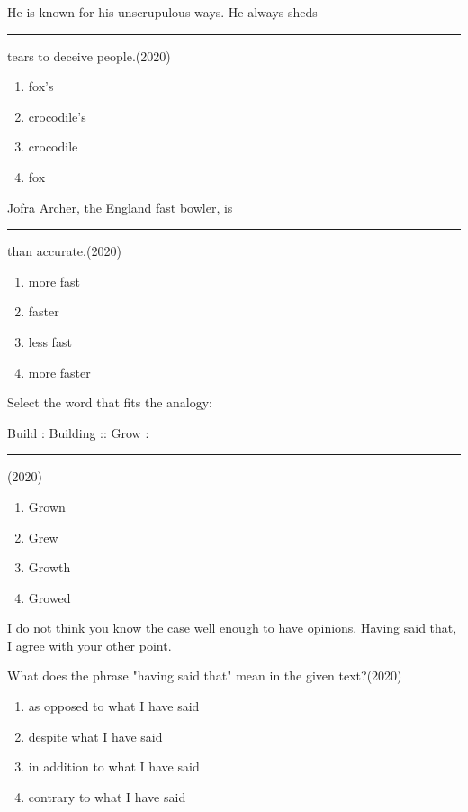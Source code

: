 \iffalse
\chapter{2020}
\author{AI24BTECH11022}
\section{me}
\fi

\usetikzlibrary{patterns}
\item He is known for his unscrupulous ways. He always sheds \rule{1cm}{0.15mm} tears to deceive people.\hfill(2020)
\begin{multicols}{2}
\begin{enumerate}
\item fox's
\item crocodile's
\item crocodile
\item fox
\end{enumerate}
\end{multicols}


\item Jofra Archer, the England fast bowler, is \rule{1cm}{0.15mm} than accurate.\hfill(2020)
\begin{multicols}{2}
\begin{enumerate}
\item more fast
\item faster
\item less fast
\item more faster
\end{enumerate}
\end{multicols}


\item Select the word that fits the analogy:

Build : Building :: Grow : \rule{1cm}{0.15mm}\hfill(2020)
\begin{multicols}{2}
\begin{enumerate}
\item Grown
\item Grew
\item Growth
\item Growed
\end{enumerate}
\end{multicols}


\item I do not think you know the case well enough to have opinions. Having said that, I agree with your other point.

What does the phrase "having said that" mean in the given text?\hfill(2020)
\begin{multicols}{2}
\begin{enumerate}
\item as opposed to what I have said
\item despite what I have said
\item in addition to what I have said
\item contrary to what I have said
\end{enumerate}
\end{multicols}


